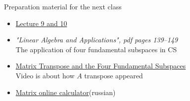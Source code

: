 \documentclass[aspectratio=169]{beamer}
\newcommand{\fbckg}[1]{\usebackgroundtemplate{\texttt{[image: \#1]}}}%
\begin{document}
\begin{frame}[t]{Preparation material for the next class}
    \Large
    \begin{itemize}
        \item \href{https://www.youtube.com/watch?v=yjBerM5jWsc&list=PL49CF3715CB9EF31D&index=9}{Lecture 9 and 10}
        \item \textit{"Linear Algebra and Applications", pdf pages 139--149 }\\ The application of four fundamental subspaces in CS
        \item \href{https://youtu.be/yfj8uMwAgrI}{Matrix Transpose and the Four Fundamental Subspaces}\\ Video is about how $A$ transpose appeared
        \item \href{https://matworld.ru/calculator/matrix-calculator-1.php}{Matrix online calculator}(russian)
    \end{itemize}
\end{frame}

\fbckg{fibeamer/figs/last_page.png}
\frame[plain]{}
\end{document}
